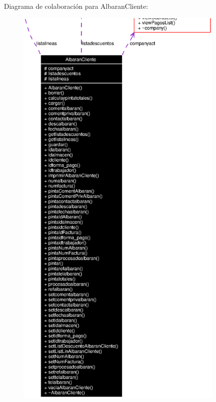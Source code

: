 Diagrama de colaboraci\'{o}n para Albaran\-Cliente:\begin{figure}[H]
\begin{center}
\leavevmode
\includegraphics[width=287pt]{classAlbaranCliente__coll__graph}
\end{center}
\end{figure}
